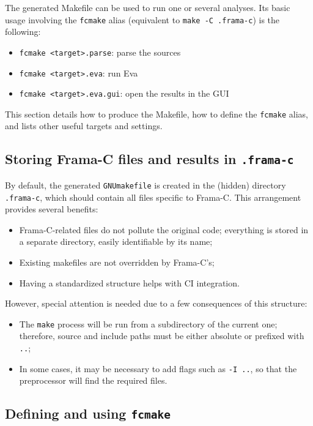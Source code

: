The generated Makefile can be used to run one or several analyses.
Its basic usage involving the \texttt{fcmake} alias (equivalent to
\texttt{make -C .frama-c}) is the following:

\begin{itemize}
\item \texttt{fcmake <target>.parse}: parse the sources
\item \texttt{fcmake <target>.eva}: run Eva
\item \texttt{fcmake <target>.eva.gui}: open the results in the GUI
\end{itemize}

This section details how to produce the Makefile, how to define the
\texttt{fcmake} alias, and lists other useful targets and settings.

\subsection*{Storing Frama-C files and results in \texttt{.frama-c}}

By default, the generated \texttt{GNUmakefile} is created in the (hidden)
directory \texttt{.frama-c}, which should contain all files specific to Frama-C.
This arrangement provides several benefits:

\begin{itemize}
\item Frama-C-related files do not pollute the original code; everything
  is stored in a separate directory, easily identifiable by its name;
\item Existing makefiles are not overridden by Frama-C's;
\item Having a standardized structure helps with CI integration.
\end{itemize}

However, special attention is needed due to a few consequences of this
structure:

\begin{itemize}
\item The \texttt{make} process will be run from a subdirectory of the
  current one; therefore, source and include paths must be either absolute
  or prefixed with \texttt{..};
\item In some cases, it may be necessary to add flags such as \texttt{-I ..},
  so that the preprocessor will find the required files.
\end{itemize}

\subsection*{Defining and using \texttt{fcmake}}

